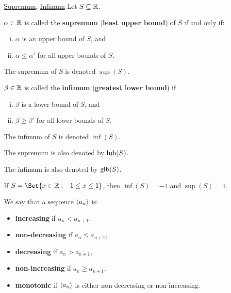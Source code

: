 \begin{Definition}{
        \href{https://proofwiki.org/wiki/Definition:Supremum_of_Set/Real_Numbers}{Supremum},
        \href{https://proofwiki.org/wiki/Definition:Infimum_of_Set/Real_Numbers}{Infimum}}{}
    Let $ S\subseteq \mathbb{R} $.\smallskip

    $ \alpha\in\mathbb{R} $ is called the \textbf{supremum} (\textbf{least upper bound})
    of $ S $ if and only if:
    \begin{enumerate}[(i)]
        \item $ \alpha $ is an upper bound of $ S $, and
        \item $ \alpha\le \alpha' $ for all upper bounds of $ S $.
    \end{enumerate}
    The supremum of $ S $ is denoted $ \sup(S) $.\bigskip

    $ \beta\in\mathbb{R} $ is called the \textbf{infimum} (\textbf{greatest lower bound}) if
    \begin{enumerate}[(i)]
        \item $ \beta $ is a lower bound of $ S $, and
        \item $ \beta\ge \beta' $ for all lower bounds of $ S $.
    \end{enumerate}
    The infimum of $ S $ is denoted $ \inf(S) $.
\end{Definition}
\begin{Remark}{}{}
    The supremum is also denoted by $ \mathrm{lub}(S) $.\bigskip

    The infimum is also denoted by $ \mathrm{glb}(S) $.
\end{Remark}
\begin{Example}{}{}
    If $ S=\Set{x\in\R:-1\le x\le 1} $, then $ \inf(S)=-1 $ and $ \sup(S)=1 $.
\end{Example}
\begin{Definition}{}{}
    We say that a sequence $ \langle a_n\rangle $ is:
    \begin{itemize}
        \item \textbf{increasing} if $ a_n<a_{n+1} $,
        \item \textbf{non-decreasing} if $ a_n\le a_{n+1} $,
        \item \textbf{decreasing} if $ a_n>a_{n+1} $,
        \item \textbf{non-increasing} if $ a_n\ge a_{n+1} $,
        \item \textbf{monotonic} if $ \langle a_n\rangle $ is either
              non-decreasing or non-increasing.
    \end{itemize}
\end{Definition}
